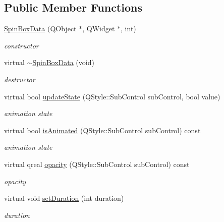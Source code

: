 \subsection*{Public Member Functions}
\begin{DoxyCompactItemize}
\item 
\mbox{\label{class_spin_box_data_a469d3c84303f0bf4a609550c69c9025b}} 
\hyperlink{class_spin_box_data_a469d3c84303f0bf4a609550c69c9025b}{Spin\+Box\+Data} (Q\+Object $\ast$, Q\+Widget $\ast$, int)
\begin{DoxyCompactList}\small\item\em constructor \end{DoxyCompactList}\item 
\mbox{\label{class_spin_box_data_abaed7d98055b4d6fa15160f54ca2d817}} 
virtual \hyperlink{class_spin_box_data_abaed7d98055b4d6fa15160f54ca2d817}{$\sim$\+Spin\+Box\+Data} (void)
\begin{DoxyCompactList}\small\item\em destructor \end{DoxyCompactList}\item 
\mbox{\label{class_spin_box_data_a7a8762d6c460056627814a9c545d3973}} 
virtual bool \hyperlink{class_spin_box_data_a7a8762d6c460056627814a9c545d3973}{update\+State} (Q\+Style\+::\+Sub\+Control sub\+Control, bool value)
\begin{DoxyCompactList}\small\item\em animation state \end{DoxyCompactList}\item 
\mbox{\label{class_spin_box_data_ae968f0487e02cbf054bc5913ba4ff78e}} 
virtual bool \hyperlink{class_spin_box_data_ae968f0487e02cbf054bc5913ba4ff78e}{is\+Animated} (Q\+Style\+::\+Sub\+Control sub\+Control) const
\begin{DoxyCompactList}\small\item\em animation state \end{DoxyCompactList}\item 
\mbox{\label{class_spin_box_data_a4e40349d5d181b82585e770ffd54f419}} 
virtual qreal \hyperlink{class_spin_box_data_a4e40349d5d181b82585e770ffd54f419}{opacity} (Q\+Style\+::\+Sub\+Control sub\+Control) const
\begin{DoxyCompactList}\small\item\em opacity \end{DoxyCompactList}\item 
\mbox{\label{class_spin_box_data_a15d4f8e4a45fd94a0770d0f34eb9b67e}} 
virtual void \hyperlink{class_spin_box_data_a15d4f8e4a45fd94a0770d0f34eb9b67e}{set\+Duration} (int duration)
\begin{DoxyCompactList}\small\item\em duration \end{DoxyCompactList}\end{DoxyCompactItemize}
